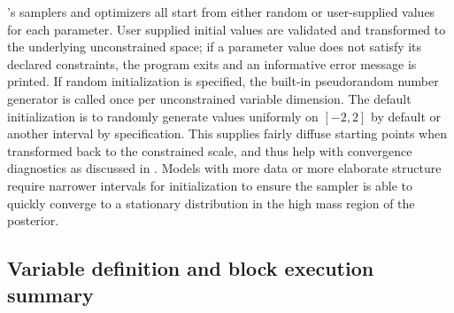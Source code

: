 \documentclass[article]{jss}
\begin{document}
's samplers and optimizers all start from either random
or user-supplied values for each parameter.  User supplied initial
values are validated and transformed to the underlying unconstrained
space; if a parameter value does not satisfy its declared constraints,
the program exits and an informative error message is printed.  If
random initialization is specified, the built-in pseudorandom number
generator is called once per unconstrained variable dimension.  The
default initialization is to randomly generate values uniformly on
$[-2,2]$ by default or another interval by specification.  This
supplies fairly diffuse starting points when transformed back to the
constrained scale, and thus help with convergence diagnostics as
discussed in \citep{GelmanEtAl:2013}.  Models with more data or more
elaborate structure require narrower intervals for initialization to
ensure the sampler is able to quickly converge to a stationary
distribution in the high mass region of the posterior.  



\subsection{Variable definition and block execution summary}
\end{document}
